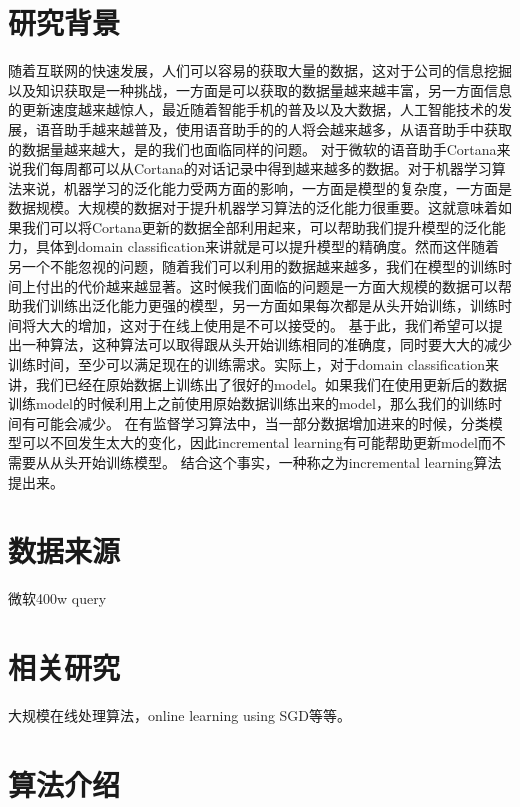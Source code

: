 \documentclass[master]{njuthesis}
\begin{document}
\section{研究背景}

随着互联网的快速发展，人们可以容易的获取大量的数据，这对于公司的信息挖掘以及知识获取是一种挑战，一方面是可以获取的数据量越来越丰富，另一方面信息的更新速度越来越惊人，最近随着智能手机的普及以及大数据，人工智能技术的发展，语音助手越来越普及，使用语音助手的的人将会越来越多，从语音助手中获取的数据量越来越大，是的我们也面临同样的问题。
对于微软的语音助手Cortana来说我们每周都可以从Cortana的对话记录中得到越来越多的数据。对于机器学习算法来说，机器学习的泛化能力受两方面的影响，一方面是模型的复杂度，一方面是数据规模。大规模的数据对于提升机器学习算法的泛化能力很重要。这就意味着如果我们可以将Cortana更新的数据全部利用起来，可以帮助我们提升模型的泛化能力，具体到domain classification来讲就是可以提升模型的精确度。然而这伴随着另一个不能忽视的问题，随着我们可以利用的数据越来越多，我们在模型的训练时间上付出的代价越来越显著。这时候我们面临的问题是一方面大规模的数据可以帮助我们训练出泛化能力更强的模型，另一方面如果每次都是从头开始训练，训练时间将大大的增加，这对于在线上使用是不可以接受的。
基于此，我们希望可以提出一种算法，这种算法可以取得跟从头开始训练相同的准确度，同时要大大的减少训练时间，至少可以满足现在的训练需求。实际上，对于domain classification来讲，我们已经在原始数据上训练出了很好的model。如果我们在使用更新后的数据训练model的时候利用上之前使用原始数据训练出来的model，那么我们的训练时间有可能会减少。
在有监督学习算法中，当一部分数据增加进来的时候，分类模型可以不回发生太大的变化，因此incremental learning有可能帮助更新model而不需要从从头开始训练模型。
结合这个事实，一种称之为incremental learning算法提出来。

\section{数据来源}

微软400w query

\section{相关研究}

大规模在线处理算法，online learning using SGD等等。

\section{算法介绍}
\end{document}
